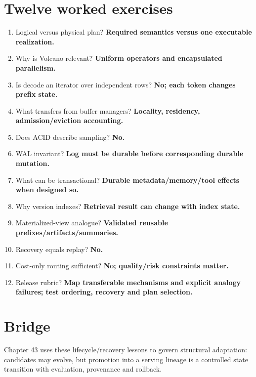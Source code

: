 \section{Twelve worked exercises}
\begin{enumerate}
\item Logical versus physical plan? \textbf{Required semantics versus one executable realization.}
\item Why is Volcano relevant? \textbf{Uniform operators and encapsulated parallelism.}
\item Is decode an iterator over independent rows? \textbf{No; each token changes prefix state.}
\item What transfers from buffer managers? \textbf{Locality, residency, admission/eviction accounting.}
\item Does ACID describe sampling? \textbf{No.}
\item WAL invariant? \textbf{Log must be durable before corresponding durable mutation.}
\item What can be transactional? \textbf{Durable metadata/memory/tool effects when designed so.}
\item Why version indexes? \textbf{Retrieval result can change with index state.}
\item Materialized-view analogue? \textbf{Validated reusable prefixes/artifacts/summaries.}
\item Recovery equals replay? \textbf{No.}
\item Cost-only routing sufficient? \textbf{No; quality/risk constraints matter.}
\item Release rubric? \textbf{Map transferable mechanisms and explicit analogy failures; test ordering, recovery and plan selection.}
\end{enumerate}

\section{Bridge}
Chapter 43 uses these lifecycle/recovery lessons to govern structural adaptation: candidates may evolve, but promotion into a serving lineage is a controlled state transition with evaluation, provenance and rollback.
